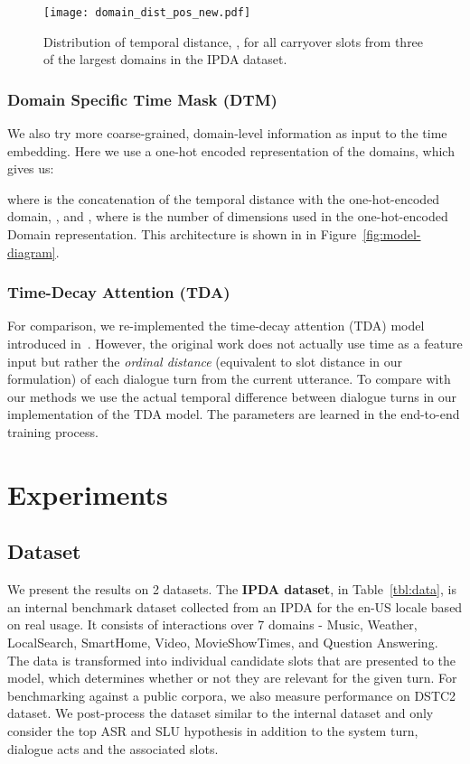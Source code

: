 \documentclass[11pt,a4paper]{article}
\begin{document}
\begin{figure}[htb]
\centering
\centerline{
    \texttt{[image: domain\_dist\_pos\_new.pdf]}
}
\caption{Distribution of temporal distance, , for all carryover slots from three of the largest domains in the IPDA dataset.}
\label{fig:domain-dist}
\end{figure}



\subsubsection{Domain Specific Time Mask (DTM)}
\label{sssec:tm-d}

We also try more coarse-grained, domain-level information as input to the time embedding.
Here we use a one-hot encoded representation of the domains, which gives us:

where  is the concatenation of the temporal distance with the one-hot-encoded domain, , and , where  is the number of dimensions used in the one-hot-encoded Domain representation.
This architecture is shown in in Figure~\ref{fig:model-diagram}.


\subsubsection{Time-Decay Attention (TDA)}
\label{sssec:tda}

For comparison, we re-implemented the time-decay attention (TDA) model introduced in~\cite{su2018time}. However, the original work does not actually use time as a feature input but rather the \textit{ordinal distance} (equivalent to slot distance in our formulation) of each dialogue turn from the current utterance. To compare with our methods we use the actual temporal difference between dialogue turns in our implementation of the TDA model. The parameters are learned in the end-to-end training process. 
\section{Experiments}
\label{sec:experiments}
\subsection{Dataset}
\label{ssec:dataset}
We present the results on 2 datasets. The {\bf IPDA dataset}, in  Table~\ref{tbl:data}, is an internal benchmark dataset collected from an IPDA for the en-US locale based on real usage. It consists of interactions over 7 domains - Music, Weather, LocalSearch, SmartHome, Video, MovieShowTimes, and Question Answering.
The data is transformed into individual candidate slots that are presented to the model, which determines whether or not they are relevant for the given turn.
For benchmarking against a public corpora, we also measure performance on DSTC2~\cite{henderson2014second} dataset.
We post-process the dataset similar to the internal dataset and only consider the top ASR and SLU hypothesis in addition to the system turn, dialogue acts and the associated slots.
\end{document}

